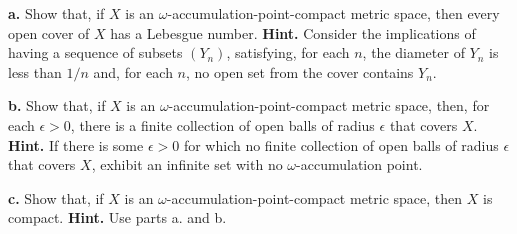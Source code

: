 \documentclass{amsart}
\theoremstyle{plain}
\theoremstyle{definition}
\theoremstyle{remark}
\begin{document}
\vspace{.1in}
\noindent
{\bfseries a.} Show that, if $X$ is an $\omega$-accumulation-point-compact metric space, then every open cover of $X$ has a Lebesgue number. {\bfseries Hint.} Consider the implications of having a sequence of subsets $(Y_n)$, satisfying, for each $n$, the diameter of $Y_n$ is less than $1/n$ and, for each $n$, no open set from the cover contains $Y_n$.  

\vspace{.1in}
\noindent
{\bfseries b.} Show that, if $X$ is an $\omega$-accumulation-point-compact metric space, then, for each $\epsilon > 0$, there is a finite collection of open balls of radius $\epsilon$ that covers $X$. {\bfseries Hint.} If there is some $\epsilon > 0$ for which no finite collection of open balls of radius $\epsilon$ that covers $X$, exhibit an infinite set with no $\omega$-accumulation point.

\vspace{.1in}
\noindent
{\bfseries c.} Show that, if $X$ is an $\omega$-accumulation-point-compact metric space, then $X$ is compact. {\bfseries Hint.} Use parts a. and b. 


 
\end{document}
